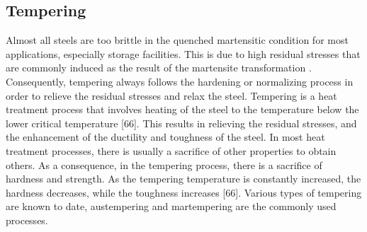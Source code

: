 \documentclass[12pt]{report}
\begin{document}
\subsection{Tempering}  
Almost all steels are too brittle in the quenched martensitic condition for most applications, especially storage facilities. This is due to high residual stresses that are commonly induced as the result of the martensite transformation \cite{mampuya2021effect}. Consequently, tempering always follows the hardening or normalizing process in order to relieve the residual stresses and relax the steel. 
Tempering is a heat treatment process that involves heating of the steel to the temperature below the lower critical temperature [66]. This results in relieving the residual stresses, and the enhancement of the ductility and toughness of the steel. In most heat treatment processes, there is usually a sacrifice of other properties to obtain others. As a consequence, in the tempering process, there is a sacrifice of hardness and strength. As the tempering temperature is constantly increased, the hardness decreases, while the toughness increases [66]. Various types of tempering are known to date, austempering and martempering are the commonly used processes.
\end{document}
